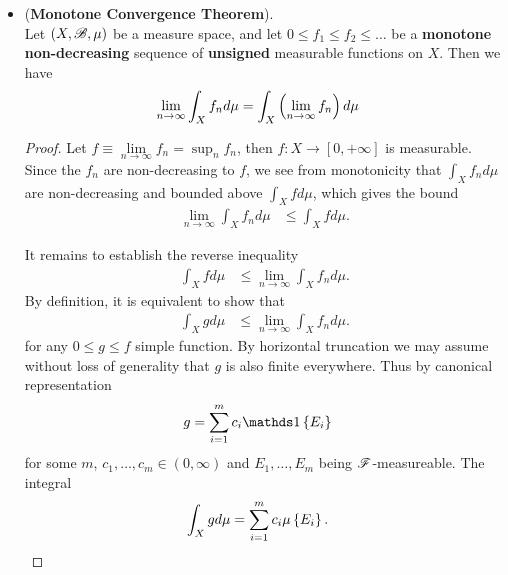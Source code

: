\documentclass[11pt]{article}
\begin{document}
\begin{itemize}
\item \begin{theorem}(\textbf{Monotone Convergence Theorem}). \citep{tao2011introduction} \\
Let $(X, {\mathscr B}, \mu)$ be a measure space, and let $0 \le f_1 \le  f_2 \le \ldots $ be a \textbf{monotone non-decreasing} sequence of \textbf{unsigned} measurable functions on $X$. Then we have
\begin{align*}
\lim\limits_{n\rightarrow \infty}\int_{X}f_{n} d\mu &= \int_{X}\left(\lim\limits_{n\rightarrow \infty} f_{n}\right) d\mu 
\end{align*}
\end{theorem}
\begin{proof}
Let $f \equiv \lim\limits_{n\rightarrow \infty} f_{n}= \sup_n f_n$, then $f : X \rightarrow  [0, +\infty]$ is measurable. Since the $f_n$ are non-decreasing to $f$, we see from monotonicity that $\int_{X}f_{n} d\mu $ are non-decreasing and bounded above $\int_{X}f d\mu$, which gives the bound
\begin{align*}
\lim\limits_{n\rightarrow \infty}\int_{X}f_{n} d\mu &\le  \int_{X}f d\mu.
\end{align*}

It remains to establish the reverse inequality
\begin{align*}
 \int_{X}f d\mu&\le \lim\limits_{n\rightarrow \infty}\int_{X}f_{n} d\mu.
\end{align*}
By definition, it is equivalent to show that 
\begin{align*}
\int_{X}g d\mu &\le \lim\limits_{n\rightarrow \infty}\int_{X}f_{n} d\mu   .
\end{align*}
for any $0\le g\le f$ simple function.  By horizontal truncation we may assume without loss of generality that $g$ is also finite everywhere. Thus by canonical representation
\begin{align*}
g&= \sum_{i=1}^{m}c_{i}\ind{E_{i}}
\end{align*} for some $m$, $c_{1},\ldots, c_{m}\in (0,\infty)$ and $E_{1},\ldots, E_{m}$ being ${\mathscr F}$-measureable. The integral 
\begin{align*}
\int_{X}g d\mu &=  \sum_{i=1}^{m}c_{i}\mu\left\{E_{i}\right\}.
\end{align*}


\end{proof}
\end{itemize}
\end{document}
